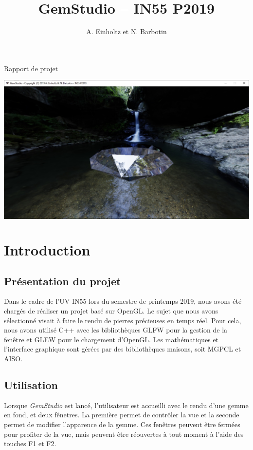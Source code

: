 \documentclass[a4paper,12pt]{article}
\title{GemStudio -- IN55 P2019}
\author{A. Einholtz et N. Barbotin}
\begin{document}
\setlength{\parindent}{0cm}
\setlength{\parskip}{8pt}

\begin{center}
    \Huge Rapport de projet\\
    \LARGE \thetitle

    \vfill
    \includegraphics[width=15cm]{screenshot.jpg}
    \vfill
\end{center}

\newpage
\tableofcontents

\newpage
\section{Introduction}
\subsection{Présentation du projet}
Dans le cadre de l'UV IN55 lors du semestre de printemps 2019, nous avons été chargés de réaliser
un projet basé sur OpenGL. Le sujet que nous avons sélectionné visait à faire le rendu de pierres
précieuses en temps réel. Pour cela, nous avons utilisé C++ avec les bibliothèques GLFW pour la
gestion de la fenêtre et GLEW pour le chargement d'OpenGL. Les mathématiques et l'interface graphique
sont gérées par des bibliothèques maisons, soit MGPCL et AISO.

\subsection{Utilisation}
Lorsque \emph{GemStudio} est lancé, l'utilisateur est accueilli avec le rendu d'une gemme en fond, et
deux fênetres. La première permet de contrôler la vue et la seconde permet de modifier l'apparence de
la gemme. Ces fenêtres peuvent être fermées pour profiter de la vue, mais peuvent être réouvertes à tout
moment à l'aide des touches F1 et F2.
\end{document}
